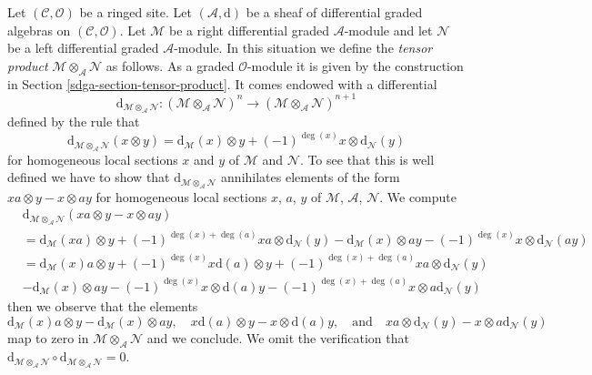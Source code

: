 \medskip\noindent
Let $(\mathcal{C}, \mathcal{O})$ be a ringed site. Let
$(\mathcal{A}, \text{d})$
be a sheaf of differential graded algebras on $(\mathcal{C}, \mathcal{O})$.
Let $\mathcal{M}$ be a right differential graded $\mathcal{A}$-module
and let $\mathcal{N}$ be a left differential graded $\mathcal{A}$-module.
In this situation we define the {\it tensor product}
$\mathcal{M} \otimes_\mathcal{A} \mathcal{N}$ as follows.
As a graded $\mathcal{O}$-module it is given by the construction
in Section \ref{sdga-section-tensor-product}. It comes endowed
with a differential
$$
\text{d}_{\mathcal{M} \otimes_\mathcal{A} \mathcal{N}} :
(\mathcal{M} \otimes_\mathcal{A} \mathcal{N})^n
\longrightarrow
(\mathcal{M} \otimes_\mathcal{A} \mathcal{N})^{n + 1}
$$
defined by the rule that
$$
\text{d}_{\mathcal{M} \otimes_\mathcal{A} \mathcal{N}}(x \otimes y) =
\text{d}_\mathcal{M}(x) \otimes y +
(-1)^{\deg(x)}x \otimes \text{d}_\mathcal{N}(y)
$$
for homogeneous local sections $x$ and $y$ of $\mathcal{M}$ and $\mathcal{N}$.
To see that this is well defined we have to show that
$\text{d}_{\mathcal{M} \otimes_\mathcal{A} \mathcal{N}}$ annihilates
elements of the form $xa \otimes y - x \otimes ay$ for homogeneous
local sections $x$, $a$, $y$ of $\mathcal{M}$, $\mathcal{A}$, $\mathcal{N}$.
We compute
\begin{align*}
&
\text{d}_{\mathcal{M} \otimes_\mathcal{A} \mathcal{N}}(
xa \otimes y - x \otimes ay) \\
& =
\text{d}_\mathcal{M}(xa) \otimes y + (-1)^{\deg(x) + \deg(a)}
xa \otimes \text{d}_\mathcal{N}(y)
-\text{d}_\mathcal{M}(x) \otimes ay - (-1)^{\deg(x)}
x \otimes \text{d}_\mathcal{N}(ay) \\
& =
\text{d}_\mathcal{M}(x)a \otimes y + (-1)^{\deg(x)}x\text{d}(a) \otimes y
+ (-1)^{\deg(x) + \deg(a)} xa \otimes \text{d}_\mathcal{N}(y) \\
&
-\text{d}_\mathcal{M}(x) \otimes ay - (-1)^{\deg(x)}
x \otimes \text{d}(a)y - (-1)^{\deg(x) +
\deg(a)} x\otimes a\text{d}_\mathcal{N}(y)
\end{align*}
then we observe that the elements
$$
\text{d}_\mathcal{M}(x)a \otimes y - \text{d}_\mathcal{M}(x) \otimes ay,\quad
x\text{d}(a) \otimes y - x \otimes \text{d}(a)y,\quad
\text{and}\quad
xa \otimes \text{d}_\mathcal{N}(y) - x\otimes a\text{d}_\mathcal{N}(y)
$$
map to zero in $\mathcal{M} \otimes_\mathcal{A} \mathcal{N}$
and we conclude. We omit the verification that
$\text{d}_{\mathcal{M} \otimes_\mathcal{A} \mathcal{N}} \circ
\text{d}_{\mathcal{M} \otimes_\mathcal{A} \mathcal{N}} = 0$.


